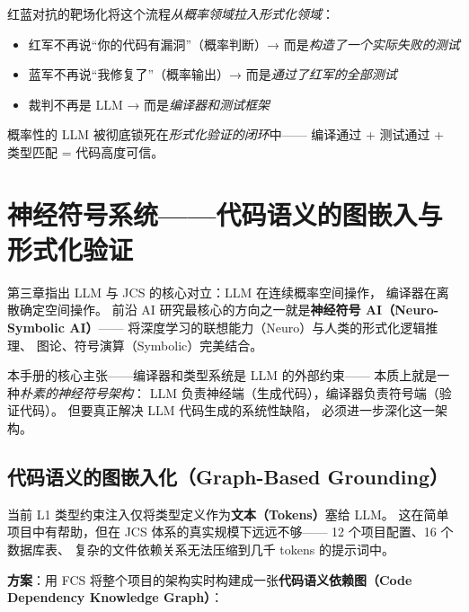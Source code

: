 \documentclass[10pt, openany]{book}
\begin{document}
\begin{principle}[从模糊对抗到形式化验证]
    红蓝对抗的靶场化将这个流程\emph{从概率领域拉入形式化领域}：
    \begin{itemize}
        \item 红军不再说``你的代码有漏洞''（概率判断）→ 而是\emph{构造了一个实际失败的测试}
        \item 蓝军不再说``我修复了''（概率输出）→ 而是\emph{通过了红军的全部测试}
        \item 裁判不再是 LLM → 而是\emph{编译器和测试框架}
    \end{itemize}
    
    概率性的 LLM 被彻底锁死在\emph{形式化验证的闭环}中——
    编译通过 + 测试通过 + 类型匹配 = 代码高度可信。
\end{principle}

\section{神经符号系统——代码语义的图嵌入与形式化验证}

第三章指出 LLM 与 JCS 的核心对立：LLM 在连续概率空间操作，
编译器在离散确定空间操作。
前沿 AI 研究最核心的方向之一就是\textbf{神经符号 AI（Neuro-Symbolic AI）}——
将深度学习的联想能力（Neuro）与人类的形式化逻辑推理、
图论、符号演算（Symbolic）完美结合。

本手册的核心主张——编译器和类型系统是 LLM 的外部约束——
本质上就是一种\emph{朴素的神经符号架构}：
LLM 负责神经端（生成代码），编译器负责符号端（验证代码）。
但要真正解决 LLM 代码生成的系统性缺陷，
必须进一步深化这一架构。

\subsection{代码语义的图嵌入化（Graph-Based Grounding）}

当前 L1 类型约束注入仅将类型定义作为\textbf{文本（Tokens）}塞给 LLM。
这在简单项目中有帮助，但在 JCS 体系的真实规模下远远不够——
12 个项目配置、16 个数据库表、
复杂的文件依赖关系无法压缩到几千 tokens 的提示词中。

\textbf{方案}：用 FCS 将整个项目的架构实时构建成一张\textbf{代码语义依赖图（Code Dependency Knowledge Graph）}：
\end{document}
